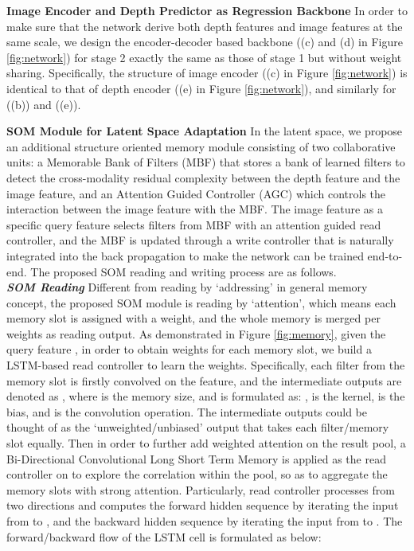 \documentclass[letterpaper]{article} \usepackage{aaai20}  \usepackage{times}  \usepackage{helvet} \usepackage{courier}  \usepackage{graphicx} \frenchspacing  \setlength{\pdfpagewidth}{8.5in}  \setlength{\pdfpageheight}{11in}  \usepackage{epsfig}
\begin{document}
    \textbf{Image Encoder and Depth Predictor as Regression Backbone} \hspace{0.3cm} In order to make sure that the network derive both depth features and image features at the same scale, we design the encoder-decoder based backbone ((c) and (d) in Figure \ref{fig:network}) for stage 2 exactly the same as those of stage 1 but without weight sharing. Specifically, the structure of image encoder  ((c) in Figure \ref{fig:network}) is identical to that of depth encoder  ((e) in Figure \ref{fig:network}), and similarly for  ((b)) and  ((e)). 
    
    \textbf{SOM Module for Latent Space Adaptation} \hspace{0.3cm} In the latent space, we propose an additional structure oriented memory module consisting of two collaborative units: a Memorable Bank of Filters (MBF) that stores a bank of learned filters to detect the cross-modality residual complexity between the depth feature and the image feature, and an Attention Guided Controller (AGC) which controls the interaction between the image feature with the MBF. The image feature as a specific query feature selects filters from MBF with an attention guided read controller, and the MBF is updated through a write controller that is naturally integrated into the back propagation to make the network can be trained end-to-end. The proposed SOM reading and writing process are as follows.\\
    \indent\textbf{\textit{SOM Reading}} Different from reading by `addressing' in general memory concept, the proposed SOM module is reading by `attention', which means each memory slot is assigned with a weight, and the whole memory is merged per weights as reading output. As demonstrated in Figure \ref{fig:memory}, given the query feature , in order to obtain weights for each memory slot, we build a LSTM-based read controller to learn the weights. Specifically, each filter from the memory slot  is firstly convolved on the feature, and the intermediate outputs are denoted as  , where  is the memory size, and  is formulated as:
    ,  is the kernel,  is the bias, and  is the convolution operation. The intermediate outputs  could be thought of as the `unweighted/unbiased' output that takes each filter/memory slot equally. Then in order to further add weighted attention on the result pool, a Bi-Directional Convolutional Long Short Term Memory is applied as the read controller on  to explore the correlation within the pool, so as to aggregate the memory slots with strong attention. Particularly, read controller processes  from two directions and computes the forward hidden sequence  by iterating the input from  to , and the backward hidden sequence  by iterating the input from  to . The forward/backward flow of the LSTM cell is formulated as below: 
    
\end{document}
